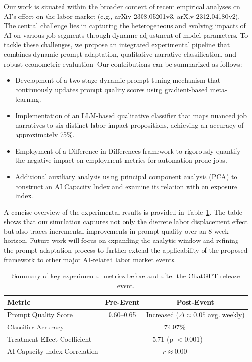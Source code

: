 \documentclass{article}
\begin{document}
Our work is situated within the broader context of recent empirical analyses on AI’s effect on the labor market (e.g., arXiv 2308.05201v3, arXiv 2312.04180v2). The central challenge lies in capturing the heterogeneous and evolving impacts of AI on various job segments through dynamic adjustment of model parameters. To tackle these challenges, we propose an integrated experimental pipeline that combines dynamic prompt adaptation, qualitative narrative classification, and robust econometric evaluation. Our contributions can be summarized as follows:
\begin{itemize}
    \item Development of a two-stage dynamic prompt tuning mechanism that continuously updates prompt quality scores using gradient-based meta-learning.
    \item Implementation of an LLM-based qualitative classifier that maps nuanced job narratives to six distinct labor impact propositions, achieving an accuracy of approximately 75\%.
    \item Employment of a Difference-in-Differences framework to rigorously quantify the negative impact on employment metrics for automation-prone jobs.
    \item Additional auxiliary analysis using principal component analysis (PCA) to construct an AI Capacity Index and examine its relation with an exposure index.
\end{itemize}

A concise overview of the experimental results is provided in Table~\ref{tab:results_summary}. The table shows that our simulation captures not only the discrete labor displacement effect but also traces incremental improvements in prompt quality over an 8-week horizon. Future work will focus on expanding the analytic window and refining the prompt adaptation process to further extend the applicability of the proposed framework to other major AI-related labor market events.

\begin{table}[h]
\centering
\begin{tabular}{lcc}
\hline
\textbf{Metric} & \textbf{Pre-Event} & \textbf{Post-Event} \\
\hline
Prompt Quality Score & 0.60--0.65 & Increased (\(\Delta \approx 0.05\) avg. weekly) \\
Classifier Accuracy & \multicolumn{2}{c}{74.97\%} \\
Treatment Effect Coefficient & \multicolumn{2}{c}{\(-5.71\) (p \(< 0.001\))} \\
AI Capacity Index Correlation & \multicolumn{2}{c}{\(r \approx 0.00\)} \\
\hline
\end{tabular}
\caption{Summary of key experimental metrics before and after the ChatGPT release event.}
\label{tab:results_summary}
\end{table}
\end{document}
